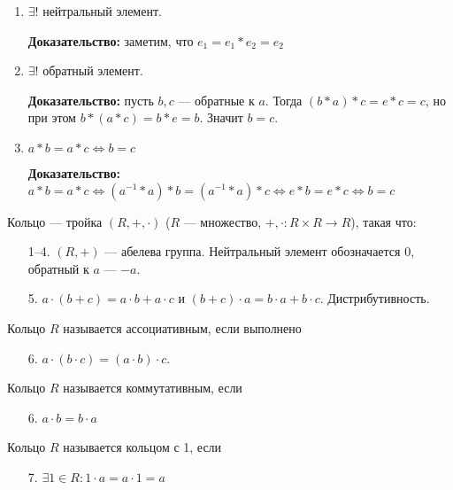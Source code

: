 \begin{enumerate}
\item $\exists!$ нейтральный элемент.

    \textbf{Доказательство:} заметим, что $e_1=e_1 \ast e_2 = e_2$
\item $\exists!$ обратный элемент. 

    \textbf{Доказательство:} пусть $b, c$ --- обратные к  $a$. Тогда  $(b\ast a)\ast c = e \ast c = c$, но при этом $b \ast (a \ast c) = b \ast e = b$. Значит  $b=c$.
\item $a \ast b = a \ast c \iff b = c$

    \textbf{Доказательство:} $a \ast b = a \ast c \iff (a^{-1} \ast a) \ast b = (a^{-1} \ast a) \ast c \iff e \ast b = e \ast c \iff b = c$
\end{enumerate}
\begin{definition}
    Кольцо --- тройка $(R, +, \cdot)$ ($R$ --- множество,  $+, \cdot: R \times R \to R$), такая что:
     \begin{enumerate}
         \item[1--4.] $(R, +)$ --- абелева группа. Нейтральный элемент обозначается $0$, обратный к  $a$ ---  $-a$.
         \item[5.] $a\cdot(b+c) = a \cdot b + a \cdot c$ и  $(b+c) \cdot a = b \cdot a + b \cdot c$. Дистрибутивность.
    \end{enumerate}
\end{definition}
\begin{definition}
    Кольцо $R$ называется ассоциативным, если выполнено 
    \begin{itemize}
        \item[6.] $a \cdot (b \cdot c) = (a \cdot b) \cdot c$.
    \end{itemize}
\end{definition}
\begin{definition}
    Кольцо $R$ называется коммутативным, если
    \begin{itemize}
        \item[6.] $a \cdot b = b \cdot a$
    \end{itemize}
\end{definition}
\begin{definition}
    Кольцо $R$ называется кольцом с 1, если  
    \begin{enumerate}
        
        \item[7.] $\exists 1 \in R: 1 \cdot a = a \cdot 1 = a$
    \end{enumerate}
\end{definition}
